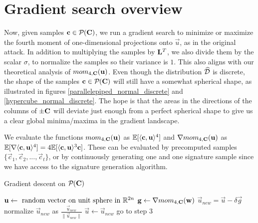 {{\section{Gradient search overview}

Now, given samples $\mathbf{c} \in \mathcal{P}_{}(\mathbf{C})$, we run a gradient search to minimize or maximize the fourth moment of one-dimensional projections onto $\vec{u}$, as in the original attack. In addition to multiplying the samples by $\mathbf{L}^T$, we also divide them by the scalar $\sigma$, to normalize the samples
so their variance is $1$. This also aligns with our theoretical analysis of $mom_{4,\mathbf{C}}(\mathbf{u})$. Even though the distribution $\widehat{\mathcal{D}}$ is discrete, the shape of the samples $\mathbf{c} \in \mathcal{P}_{}(\mathbf{C})$ will still have a somewhat spherical shape,
as illustrated in figures \ref{parallelepiped_normal_discrete} and \ref{hypercube_normal_discrete}.
The hope is that the areas in the directions of the columns of $\pm \mathbf{C}$ will deviate just enough from a perfect spherical shape to give us a clear global minima/maxima in the gradient landscape.

We evaluate the functions $mom_{4, \mathbf{C}}(\mathbf{u})$ as $\mathbb{E} [\langle \mathbf{c}, \mathbf{u} \rangle ^4]$ and $\nabla mom_{4,\mathbf{C}}(\mathbf{u})$ as $\mathbb{E} [\nabla \langle \mathbf{c}, \mathbf{u} \rangle ^4] = 4 \mathbb{E} [\langle \mathbf{c}, \mathbf{u} \rangle ^3 \mathbf{c}]$.
These can be evaluated by precomputed samples $\{\vec{c}_1, \vec{c}_2, ..., \vec{c}_t\}$, or by continuously generating one and one signature sample since we have access to the signature generation algorithm.

\begin{algorithm}[H]
    \caption{Gradient descent on $\mathcal{P}_{}(\mathbf{C})$}
\begin{algorithmic}[1]
    \State $\mathbf{u} \gets \text{ random vector on unit sphere in } \mathbb{R}^{2n}$
    \Loop
    \State $\mathbf{g} \gets \nabla mom_{4, \mathbf{C}}(\mathbf{w})$
    \State $\vec{u}_{new} = \vec{u} - \delta \vec{g}$
    \State normalize $\vec{u}_{new}$ as $\frac{\vec{u}_{new}}{\lVert \vec{u}_{new} \rVert}$
    \State {}
    \Else 
    \State $\vec{u} \gets \vec{u}_{new}$
    \State go to step 3
    \EndIf
    \EndLoop
\end{algorithmic}
\end{algorithm}

}}
